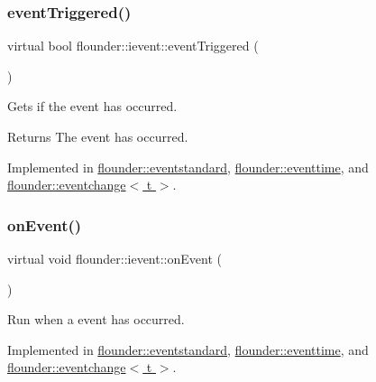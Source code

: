 \subsubsection{\texorpdfstring{event\+Triggered()}{eventTriggered()}}
{\footnotesize\ttfamily virtual bool flounder\+::ievent\+::event\+Triggered (\begin{DoxyParamCaption}{ }\end{DoxyParamCaption})\hspace{0.3cm}{\ttfamily [pure virtual]}}



Gets if the event has occurred. 

\begin{DoxyReturn}{Returns}
The event has occurred. 
\end{DoxyReturn}


Implemented in \hyperlink{classflounder_1_1eventstandard_a88224b7246627df26a08ec9e286e7496}{flounder\+::eventstandard}, \hyperlink{classflounder_1_1eventtime_a67a616128c8e4701f7e229172c5e80a5}{flounder\+::eventtime}, and \hyperlink{classflounder_1_1eventchange_a2ae3c1f7ae4342dfff2aae6f11b0b413}{flounder\+::eventchange$<$ t $>$}.

\mbox{\label{classflounder_1_1ievent_a6c6abe67435870b25eccd57a251a8992}} 
\subsubsection{\texorpdfstring{on\+Event()}{onEvent()}}
{\footnotesize\ttfamily virtual void flounder\+::ievent\+::on\+Event (\begin{DoxyParamCaption}{ }\end{DoxyParamCaption})\hspace{0.3cm}{\ttfamily [pure virtual]}}



Run when a event has occurred. 



Implemented in \hyperlink{classflounder_1_1eventstandard_af25e174b30e7d23698024b2c1ae9ac4c}{flounder\+::eventstandard}, \hyperlink{classflounder_1_1eventtime_a1b066c00fa959786bb1e9bbd1d212691}{flounder\+::eventtime}, and \hyperlink{classflounder_1_1eventchange_aa4fd4c3c28ac6927c3a810c8775f232d}{flounder\+::eventchange$<$ t $>$}.

\mbox{\label{classflounder_1_1ievent_a7017c8803df2397758980cb61020e801}} 
